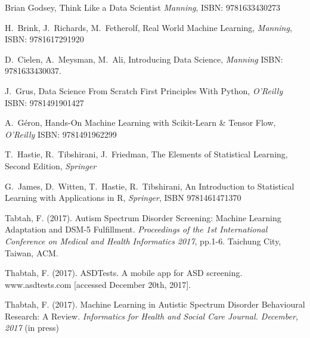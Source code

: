 \documentclass[12pt, oneside]{article}
\theoremstyle{definition}
\begin{document}
\begin{thebibliography}{00}

 Brian Godsey, 
Think Like a Data Scientist {\em Manning}, ISBN: 9781633430273 

 H.~Brink, J.~Richards, M.~Fetherolf, Real World Machine Learning,
 {\em Manning}, ISBN: 9781617291920

 D.~Cielen, A.~Meysman, M.~Ali,
Introducing Data Science, {\em
Manning} ISBN: 9781633430037.

 J.~Grus, Data Science From Scratch First Principles With Python, {\em O'Reilly} 
ISBN: 9781491901427

 A.~G\'{e}ron, Hands-On Machine Learning with Scikit-Learn \& Tensor Flow, {\em O'Reilly} 
ISBN: 9781491962299

 T.~Hastie, R.~Tibshirani, J.~Friedman, The Elements of Statistical Learning, Second Edition, {\em Springer} 

 G.~James, D.~Witten, T.~Hastie, R.~Tibshirani, An Introduction to Statistical Learning with Applications in R, {\em Springer}, ISBN 9781461471370


 Tabtah, F. (2017). Autism Spectrum Disorder Screening: Machine Learning Adaptation and DSM-5 Fulfillment. {\em Proceedings of the 1st International Conference on Medical and Health Informatics 2017}, pp.1-6. Taichung City, Taiwan, ACM.

  Thabtah, F. (2017). ASDTests. A mobile app for ASD screening. www.asdtests.com [accessed December 20th, 2017].

  Thabtah, F. (2017). Machine Learning in Autistic Spectrum Disorder Behavioural Research: A Review. { \em Informatics for Health and Social Care Journal. December, 2017} (in press) 

 \end{thebibliography}

\end{document}
